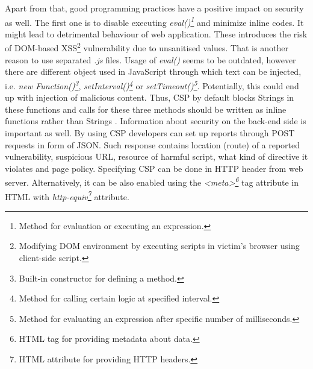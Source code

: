\documentclass{article} %
\begin{document}
\newline
Apart from that, good programming practices have a positive impact on security as well. The first one is to disable executing \textit{eval()\footnote{Method for evaluation or executing an expression.}} and minimize inline codes. It might lead to detrimental behaviour of web application. These introduces the risk of DOM-based XSS\footnote{Modifying DOM environment by executing scripts in victim's browser using client-side script.} vulnerability due to unsanitised values. That is another reason to use separated \textit{.js} files. Usage of \textit{eval()} seems to be outdated, however there are different object used in JavaScript through which text can be injected, i.e. \textit{new Function()\footnote{Built-in constructor for defining a method.}}, \textit{setInterval()\footnote{Method for calling certain logic at specified interval.}} or \textit{setTimeout()\footnote{Method for evaluating an expression after specific number of milliseconds.}}. Potentially, this could end up with injection of malicious content. Thus, CSP by default blocks Strings in these functions and calls for these three methods should be written as inline functions rather than Strings \cite{bib:csp_google}. Information about security on the back-end side is important as well. By using CSP developers can set up reports through POST requests in form of JSON. Such response contains location (route) of a reported vulnerability, suspicious URL, resource of harmful script, what kind of directive it violates and page policy. Specifying CSP can be done in HTTP header from web server. Alternatively, it can be also enabled using the \textit{<meta>\footnote{HTML tag for providing metadata about data.}} tag attribute in HTML with \textit{http-equiv\footnote{HTML attribute for providing HTTP headers.}} attribute.\\
\newline
\end{document}
